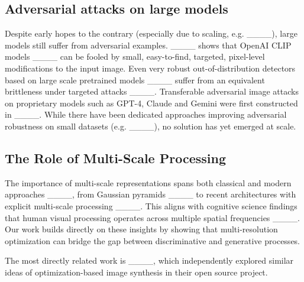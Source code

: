 \subsection{Adversarial attacks on large models}
Despite early hopes to the contrary (especially due to scaling, e.g. ____), large models still suffer from adversarial examples. ____ shows that OpenAI CLIP models ____ can be fooled by small, easy-to-find, targeted, pixel-level modifications to the input image. Even very robust out-of-distribution detectors based on large scale pretrained models ____ suffer from an equivalent brittleness under targeted attacks ____. Transferable adversarial image attacks on proprietary models such as GPT-4, Claude and Gemini were first constructed in ____. While there have been dedicated approaches improving adversarial robustness on small datasets (e.g. ____), no solution has yet emerged at scale.

\subsection{The Role of Multi-Scale Processing}
The importance of multi-scale representations spans both classical and modern approaches ____, from Gaussian pyramids ____ to recent architectures with explicit multi-scale processing ____. This aligns with cognitive science findings that human visual processing operates across multiple spatial frequencies ____. Our work builds directly on these insights by showing that multi-resolution optimization can bridge the gap between discriminative and generative processes.

The most directly related work is ____, which independently explored similar ideas of optimization-based image synthesis in their open source project.